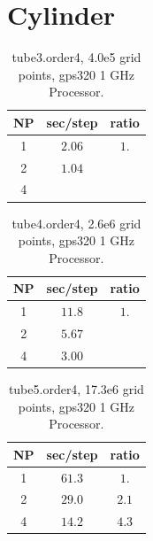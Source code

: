 \documentclass[11pt]{article}
\begin{document}




\clearpage
\section{Cylinder}

\begin{table}[hbt]
\begin{center}\footnotesize
\begin{tabular}{|c|c|c|} \hline 
     NP       & sec/step   & ratio \\   \hline\hline 
     1        &  $2.06$    & $ 1. $   \\ 
     2        &  $1.04$    & $    $   \\ 
     4        &  $    $    & $    $   \\ \hline 
\end{tabular}		
\end{center}		
\caption{tube3.order4, 4.0e5 grid points, gps320 1 GHz Processor.}
 \label{tab:box} 
\end{table}

\begin{table}[hbt]
\begin{center}\footnotesize
\begin{tabular}{|c|c|c|} \hline 
     NP       & sec/step   & ratio \\   \hline\hline 
     1        &  $11.8$    & $ 1. $   \\ 
     2        &  $5.67$    & $    $   \\ 
     4        &  $3.00$    & $    $   \\ \hline 
\end{tabular}		
\end{center}		
\caption{tube4.order4, 2.6e6 grid points, gps320 1 GHz Processor.}
 \label{tab:box} 
\end{table}

\begin{table}[hbt]
\begin{center}\footnotesize
\begin{tabular}{|c|c|c|} \hline 
     NP       & sec/step   & ratio \\   \hline\hline 
     1        &  $61.3$    & $ 1. $   \\ 
     2        &  $29.0$    & $ 2.1 $   \\ 
     4        &  $14.2$    & $ 4.3 $   \\ \hline 
\end{tabular}		
\end{center}		
\caption{tube5.order4, 17.3e6 grid points, gps320 1 GHz Processor.}
 \label{tab:box} 
\end{table}
\end{document}
